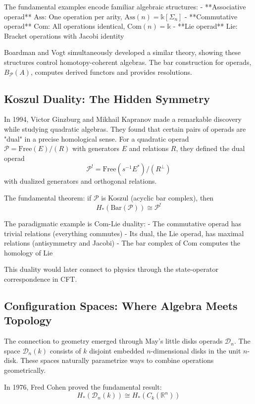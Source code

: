 The fundamental examples encode familiar algebraic structures:
- **Associative operad** $\text{Ass}$: One operation per arity, $\text{Ass}(n) = \mathbb{k}[\Sigma_n]$
- **Commutative operad** $\text{Com}$: All operations identical, $\text{Com}(n) = \mathbb{k}$  
- **Lie operad** $\text{Lie}$: Bracket operations with Jacobi identity

Boardman and Vogt \cite{BV73} simultaneously developed a similar theory, showing these structures control homotopy-coherent algebras. The bar construction for operads, $B_{\mathcal{P}}(A)$, computes derived functors and provides resolutions.

\subsection{Koszul Duality: The Hidden Symmetry}

In 1994, Victor Ginzburg and Mikhail Kapranov \cite{GK94} made a remarkable discovery while studying quadratic algebras. They found that certain pairs of operads are "dual" in a precise homological sense. For a quadratic operad $\mathcal{P} = \text{Free}(E)/(R)$ with generators $E$ and relations $R$, they defined the dual operad
$$\mathcal{P}^! = \text{Free}(s^{-1}E^*)/(R^\perp)$$
with dualized generators and orthogonal relations.

The fundamental theorem: if $\mathcal{P}$ is Koszul (acyclic bar complex), then
$$H_*(\text{Bar}(\mathcal{P})) \cong \mathcal{P}^!$$

The paradigmatic example is Com-Lie duality:
- The commutative operad has trivial relations (everything commutes)
- Its dual, the Lie operad, has maximal relations (antisymmetry and Jacobi)
- The bar complex of Com computes the homology of Lie

This duality would later connect to physics through the state-operator correspondence in CFT.

\subsection{Configuration Spaces: Where Algebra Meets Topology}

The connection to geometry emerged through May's little disks operads $\mathcal{D}_n$. The space $\mathcal{D}_n(k)$ consists of $k$ disjoint embedded $n$-dimensional disks in the unit $n$-disk. These spaces naturally parametrize ways to combine operations geometrically.

In 1976, Fred Cohen \cite{Coh76} proved the fundamental result:
$$H_*(\mathcal{D}_n(k)) \cong H_*(C_k(\mathbb{R}^n))$$

